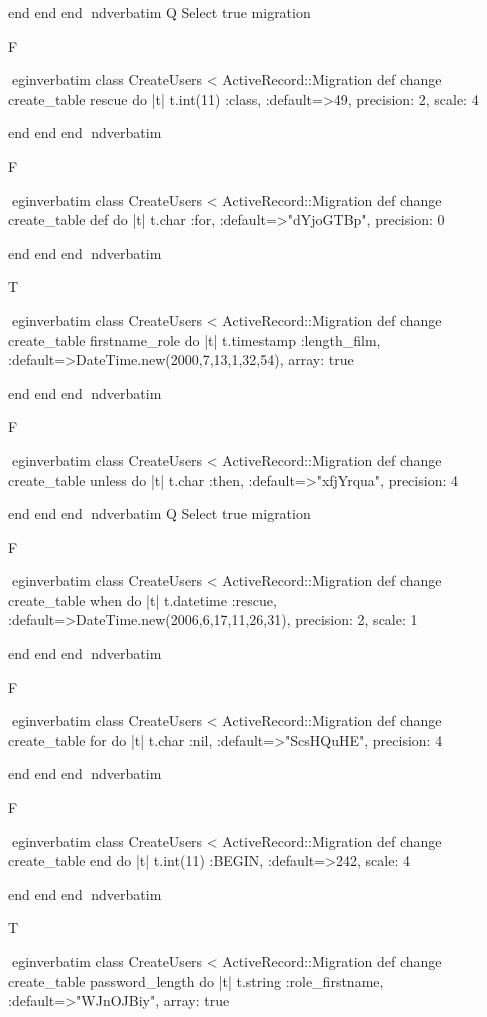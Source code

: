     end 
  end 
end
nd{verbatim}
Q
 Select true migration

F

egin{verbatim}
 class CreateUsers < ActiveRecord::Migration 
  def change 
    create_table rescue do |t| 
      t.int(11) :class, :default=>49, precision: 2, scale: 4
    
    end 
  end 
end
nd{verbatim}

F

egin{verbatim}
 class CreateUsers < ActiveRecord::Migration 
  def change 
    create_table def do |t| 
      t.char :for, :default=>"dYjoGTBp", precision: 0
    
    end 
  end 
end
nd{verbatim}

T

egin{verbatim}
 class CreateUsers < ActiveRecord::Migration 
  def change 
    create_table firstname_role do |t| 
      t.timestamp :length_film, :default=>DateTime.new(2000,7,13,1,32,54), array: true
    
    end 
  end 
end
nd{verbatim}

F

egin{verbatim}
 class CreateUsers < ActiveRecord::Migration 
  def change 
    create_table unless do |t| 
      t.char :then, :default=>"xfjYrqua", precision: 4
    
    end 
  end 
end
nd{verbatim}
Q
 Select true migration

F

egin{verbatim}
 class CreateUsers < ActiveRecord::Migration 
  def change 
    create_table when do |t| 
      t.datetime :rescue, :default=>DateTime.new(2006,6,17,11,26,31), precision: 2, scale: 1
    
    end 
  end 
end
nd{verbatim}

F

egin{verbatim}
 class CreateUsers < ActiveRecord::Migration 
  def change 
    create_table for do |t| 
      t.char :nil, :default=>"ScsHQuHE", precision: 4
    
    end 
  end 
end
nd{verbatim}

F

egin{verbatim}
 class CreateUsers < ActiveRecord::Migration 
  def change 
    create_table end do |t| 
      t.int(11) :BEGIN, :default=>242, scale: 4
    
    end 
  end 
end
nd{verbatim}

T

egin{verbatim}
 class CreateUsers < ActiveRecord::Migration 
  def change 
    create_table password_length do |t| 
      t.string :role_firstname, :default=>"WJnOJBiy", array: true
    
